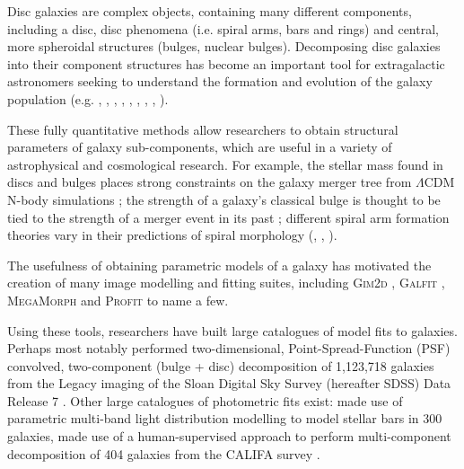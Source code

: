 \documentclass[../main.tex]{subfiles}
\begin{document}
\label{sec:introduction}

Disc galaxies are complex objects, containing many different components, including a disc, disc phenomena (i.e. spiral arms, bars and rings) and central, more spheroidal structures (bulges, nuclear bulges). Decomposing disc galaxies into their component structures has become an important tool for extragalactic astronomers seeking to understand the formation and evolution of the galaxy population (e.g. \citealt{Simard2002:astro-ph/0205025v2}, \citealt{2011ApJS..196...11S}, \citealt{2012MNRAS.421.2277L}, \citealt{2017MNRAS.469.3363K}, \citealt{megamorph-paper}, \citealt{2011MNRAS.415.3308G}, \citealt{Mendez-Abreu2016:1610.05324v1}, \citealt{Park2006:astro-ph/0611610v2}, \citealt{2015ApJS..219....4S}).

These fully quantitative methods allow researchers to obtain structural parameters of galaxy sub-components, which are useful in a variety of astrophysical and cosmological research. For example, the stellar mass found in discs and bulges places strong constraints on the galaxy merger tree from $\Lambda\mathrm{CDM}$ N-body simulations \citep{Hopkins2010:1004.2708v3}; the strength of a galaxy's classical bulge is thought to be tied to the strength of a merger event in its past \citep{Kormendy2010:1009.3015v1}; different spiral arm formation theories vary in their predictions of spiral morphology (\citealt{Dobbs2014:1407.5062v1}, \citealt{Pour-Imani2016:1608.00969v1}, \citealt{2017MNRAS.472.2263H}).

The usefulness of obtaining parametric models of a galaxy has motivated the creation of many image modelling and fitting suites, including \textsc{Gim2d} \citep{gim2d-paper}, \textsc{Galfit} \citep{galfit-paper}, \textsc{MegaMorph} \citep{megamorph-paper} and \textsc{Profit} \citep{profit-paper} to name a few.

Using these tools, researchers have built large catalogues of model fits to galaxies. Perhaps most notably \citet{2011ApJS..196...11S} performed two-dimensional, Point-Spread-Function (PSF) convolved, two-component (bulge + disc) decomposition of 1,123,718 galaxies from the Legacy imaging of the Sloan Digital Sky Survey (hereafter SDSS) Data Release 7 \citep{SDSSDR7}. Other large catalogues of photometric fits exist: \cite{2011MNRAS.415.3308G} made use of parametric multi-band light distribution modelling to model stellar bars in 300 galaxies, \cite{Mendez-Abreu2016:1610.05324v1} made use of a human-supervised approach to perform multi-component decomposition of 404 galaxies from the CALIFA survey \citep{Sanchez2011:1111.0962v2}.
\end{document}

